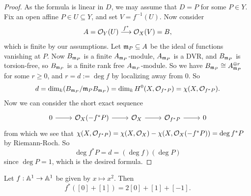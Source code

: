 \begin{proof}
  As the formula is linear in $D$, we may
  assume that $D = P$ for some $P \in Y$.
  Fix an open affine $P \in U \subseteq Y$, and
  set $V = f^{-1}(U)$. Now consider
  \[
    A = \mathcal{O}_Y(U)
    \overset{f^*}{\longrightarrow}
    \mathcal{O}_X(V) = B,
  \]
  which is finite by our assumptions.
  Let $\mathfrak{m}_P \subseteq A$ be the ideal
  of functions vanishing at $P$. Now
  $B_{\mathfrak{m}_P}$ is a finite $A_{\mathfrak{m}_P}$-module,
  $A_{\mathfrak{m}_P}$ is a DVR, and $B_{\mathfrak{m}_P}$ is
  torsion-free, so $B_{\mathfrak{m}_P}$ is a finite
  rank free $A_{\mathfrak{m}_P}$-module.
  So we have $B_{\mathfrak{m}_P} \cong A_{\mathfrak{m}_P}^{\oplus r}$ for some
  $r \ge 0$, and $r = d := \deg f$ by localizing
  away from $0$. So
  \[
    d = \dim_k (B_{\mathfrak{m}_P} / \mathfrak{m}_P B_{\mathfrak{m}_P})
    = \dim_k H^0(X, \mathcal{O}_{f^* P})
    = \chi(X, \mathcal{O}_{f^* P}).
  \]
  Now we can consider the short exact sequence
  \[
    \begin{tikzcd}
      0 \ar[r] & \OO_X(-f^* P) \ar[r] & \OO_X \ar[r] & \OO_{f^* P} \ar[r] & 0
    \end{tikzcd}
  \]
  from which we see that
  $\chi(X, \mathcal{O}_{f^* P}) = \chi(X, \mathcal{O}_X) - \chi(X, \mathcal{O}_X(-f^* P)) = \deg f^* P$
  by Riemann-Roch. So
  \[
    \deg f^* P = d = (\deg f)(\deg P)
  \]
  since $\deg P = 1$,
  which is the desired formula.
\end{proof}

\begin{example}
  Let $f : \mathbb{A}^1 \to \mathbb{A}^1$
  be given by $x \mapsto x^2$. Then
  \[
    f^*([0] + [1])
    = 2[0] + [1] + [-1].
  \]
\end{example}

